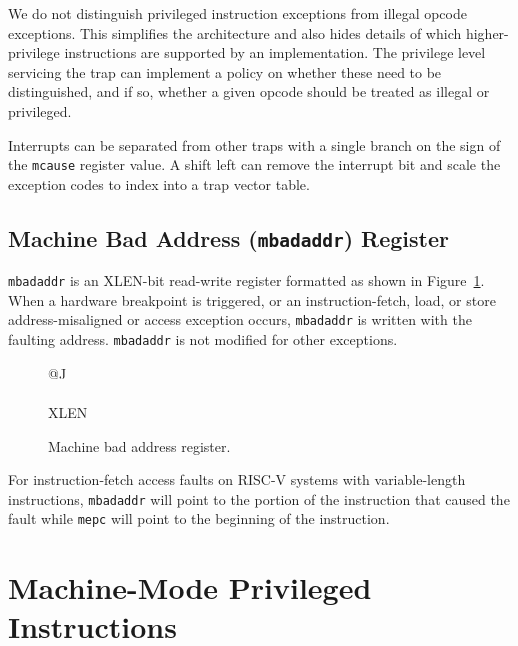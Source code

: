 \begin{commentary}
We do not distinguish privileged instruction exceptions from illegal
opcode exceptions.  This simplifies the architecture and also hides
details of which higher-privilege instructions are supported by an
implementation.  The privilege level servicing the trap can implement
a policy on whether these need to be distinguished, and if so, whether
a given opcode should be treated as illegal or privileged.
\end{commentary}

\begin{commentary}
Interrupts can be separated from other traps with a single branch on the sign of
the {\tt mcause} register value.  A shift left can remove the
interrupt bit and scale the exception codes to index into a trap
vector table.
\end{commentary}

\subsection{Machine Bad Address ({\tt mbadaddr}) Register}

{\tt mbadaddr} is an XLEN-bit read-write register formatted as shown in
Figure~\ref{mbadaddrreg}. When a hardware breakpoint is triggered, or an
instruction-fetch, load, or store address-misaligned or access exception
occurs, {\tt mbadaddr} is written with the faulting address. {\tt mbadaddr} is
not modified for other exceptions.

\begin{figure}[h!]
{\footnotesize
\begin{center}
\begin{tabular}{@{}J}
 \\
\hline
{} \\
\hline
XLEN \\
\end{tabular}
\end{center}
}
\vspace{-0.1in}
\caption{Machine bad address register.}
\label{mbadaddrreg}
\end{figure}

For instruction-fetch access faults on RISC-V systems with
variable-length instructions, {\tt mbadaddr} will point to the
portion of the instruction that caused the fault while {\tt mepc} will
point to the beginning of the instruction.

\section{Machine-Mode Privileged Instructions}


